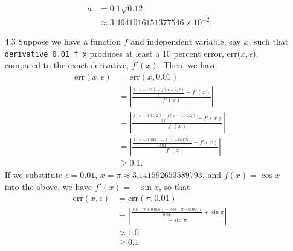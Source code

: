 \documentclass{article}
\begin{document}
\begin{itemize}
    \begin{equation*}
        \begin{split}
            a &= 0.1\sqrt{0.12} \\
            &\approx 3.4641016151377546 \times {10}^{-2}.
        \end{split}
    \end{equation*}
    \item[4.3]
    Suppose we have a function $f$ and independent variable, say $x$, such that 
    \verb|derivative 0.01 f x| produces at least a 10 percent error, err($x, \epsilon$), compared to 
    the exact derivative, $f'(x)$. Then, we have
    \begin{equation*}
        \begin{split}
            \text{err}(x, \epsilon) &= \text{err}(x, 0.01) \\ 
            &= \left| \frac{\frac{f(x + \epsilon/2) - f(x - \epsilon/2)}{\epsilon} - 
            f'(x)}{f'(x)} \right| \\
            &= \left| \frac{\frac{f(x + 0.01/2) - f(x - 0.01/2)}{0.01} - f'(x)}{f'(x)} \right| \\
            &= \left| \frac{\frac{f(x + 0.005) - f(x - 0.005)}{0.01} - f'(x)}{f'(x)} \right| \\
            &\geq 0.1.
        \end{split}
    \end{equation*}
    \qquad If we substitute $\epsilon = 0.01$, $x = \pi \approx 3.141592653589793$, and
    $f(x) = \cos{x}$ into the above, we have $f'(x) = -\sin{x}$, so that
    \begin{equation*}
        \begin{split}
            \text{err}(x, \epsilon) &= \text{err}(\pi, 0.01) \\ 
            &= \left| \frac{\frac{\cos{(\pi + 0.005)} - \cos{(\pi - 0.005)}}{0.01} 
            + \sin{\pi}}{-\sin{\pi}} \right| \\
            &\approx 1.0 \\
            &\geq 0.1.
        \end{split}
    \end{equation*}
\end{itemize}
\end{document}

